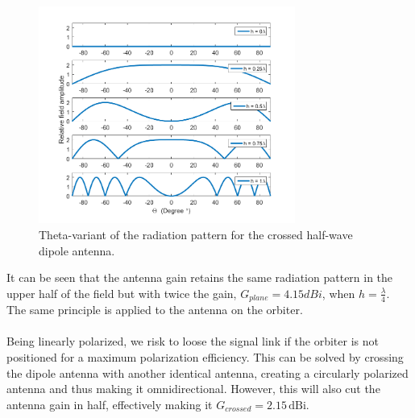 \begin{figure}[!htb]
	\centering
	\includegraphics[width=0.75\textwidth]{figures/Rasmus/LobesReport}
	\caption{Theta-variant of the radiation pattern for the crossed half-wave dipole antenna.
	\label{fig:Lobes}}
\end{figure}
It can be seen that the antenna gain retains the same radiation pattern in the upper half of the field but with twice the gain, $G_{plane}=4.15dBi$, when $h=\frac{\lambda}{4}$.\\
The same principle is applied to the antenna on the orbiter.\\
\\
Being linearly polarized, we risk to loose the signal link if the orbiter is not positioned for a maximum polarization efficiency. This can be solved by crossing the dipole antenna with another identical antenna, creating a circularly polarized antenna and thus making it omnidirectional. However, this will also cut the antenna gain in half, effectively making it $G_{crossed}=2.15\,\mathrm{dBi}$. 


